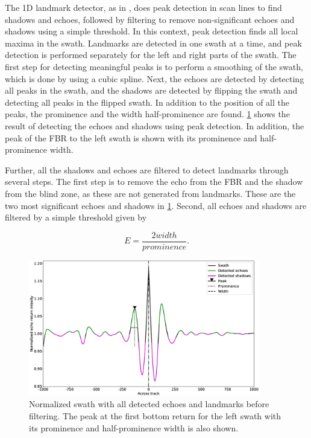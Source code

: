 The 1D landmark detector, as in \cite{Al-Rawi2017LandmarkImages}, does peak detection in scan lines to find shadows and echoes, followed by filtering to remove non-significant echoes and shadows using a simple threshold. In this context, peak detection finds all local maxima in the swath. Landmarks are detected in one swath at a time, and peak detection is performed separately for the left and right parts of the swath. The first step for detecting meaningful peaks is to perform a smoothing of the swath, which is done by using a cubic spline. Next, the echoes are detected by detecting all peaks in the swath, and the shadows are detected by flipping the swath and detecting all peaks in the flipped swath. In addition to the position of all the peaks, the prominence and the width half-prominence are found. \cref{fig:1D_swath_w_landmarks} shows the result of detecting the echoes and shadows using peak detection. In addition, the peak of the FBR to the left swath is shown with its prominence and half-prominence width.

Further, all the shadows and echoes are filtered to detect landmarks through several steps. The first step is to remove the echo from the FBR and the shadow from the blind zone, as these are not generated from landmarks. These are the two most significant echoes and shadows in \cref{fig:1D_swath_w_landmarks}. Second, all echoes and shadows are filtered by a simple threshold given by

\begin{equation}
    E = \frac{2 width}{prominence}.
    \label{eq:1D_thres}
\end{equation}

\begin{figure}
    \centering
    \includegraphics[width=0.9\textwidth]{figures/1D_swath_w_landmarks.eps}
    \caption{Normalized swath with all detected echoes and landmarks before filtering. The peak at the first bottom return for the left swath with its prominence and half-prominence width is also shown.}
    \label{fig:1D_swath_w_landmarks}
\end{figure}

